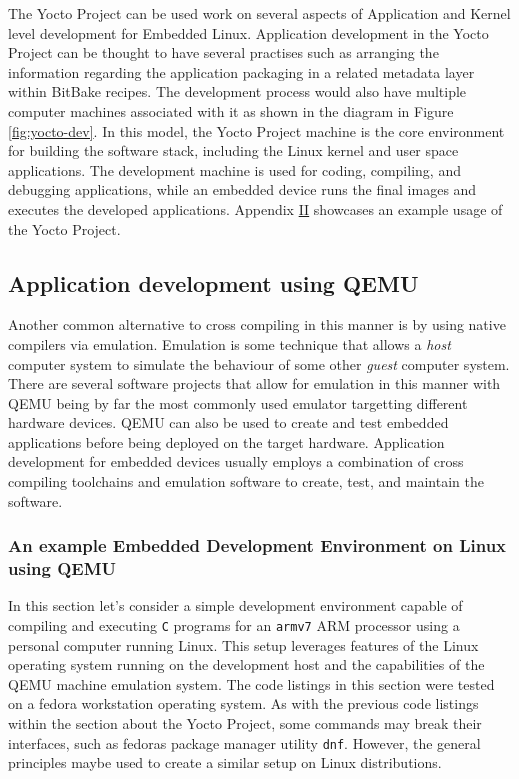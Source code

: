 The Yocto Project can be used work on several aspects of Application and Kernel level development for Embedded Linux. Application development in the Yocto Project can be thought to have several practises such as arranging the information regarding the application packaging in a related metadata layer within BitBake recipes. The development process would also have multiple computer machines associated with it as shown in the diagram in Figure \ref{fig:yocto-dev}. In this model, the Yocto Project machine is the core environment for building the software stack, including the Linux kernel and user space applications. The development machine is used for coding, compiling, and debugging applications, while an embedded device runs the final images and executes the developed applications. Appendix \hyperref[yocto-setup]{II} showcases an example usage of the Yocto Project.

\subsection{Application development using QEMU}

Another common alternative to cross compiling in this manner is by using native compilers via emulation. Emulation is some technique that allows a \textit{host} computer system to simulate the behaviour of some other \textit{guest} computer system. There are several software projects that allow for emulation in this manner with QEMU being by far the most commonly used emulator targetting different hardware devices. QEMU can also be used to create and test embedded applications before being deployed on the target hardware. Application development for embedded devices usually employs a combination of cross compiling toolchains and emulation software to create, test, and maintain the software.

\subsubsection{An example Embedded Development Environment on Linux using QEMU}

In this section let's consider a simple development environment capable of compiling and executing \texttt{C} programs for an \texttt{armv7} ARM processor using a personal computer running Linux. This setup leverages features of the Linux operating system running on the development host and the capabilities of the QEMU machine emulation system. The code listings in this section were tested on a fedora workstation operating system. As with the previous code listings within the section about the Yocto Project, some commands may break their interfaces, such as fedora\textquotesingle s package manager utility \texttt{dnf}. However, the general principles maybe used to create a similar setup on Linux distributions.

